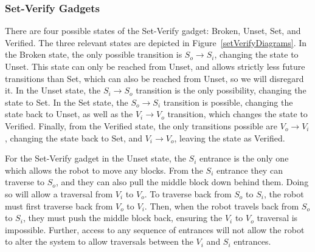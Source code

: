 %
\subsubsection{Set-Verify Gadgets}
\label{sec:SetVerifyGadgets}
There are four possible states of the Set-Verify gadget: Broken, Unset, Set, and Verified. The three relevant states are depicted in Figure~\ref{setVerifyDiagrams}. In the Broken state, the only possible transition is $S_o \rightarrow S_i$, changing the state to Unset. This state can only be reached from Unset, and allows strictly less future transitions than Set, which can also be reached from Unset, so we will disregard it. In the Unset state, the $S_i \rightarrow S_o$ transition is the only possibility, changing the state to Set. In the Set state, the $S_o \rightarrow S_i$ transition is possible, changing the state back to Unset, as well as the $V_i \rightarrow V_o$ transition, which changes the state to Verified. Finally, from the Verified state, the only transitions possible are $V_o \rightarrow V_i$, changing the state back to Set, and $V_i \rightarrow V_o$, leaving the state as Verified.

For the Set-Verify gadget in the Unset state, the $S_i$ entrance is the only one which allows the robot to move any blocks. From the $S_i$ entrance they can traverse to $S_o$, and they can also pull the middle block down behind them. Doing so will allow a traversal from $V_i$ to $V_o$. To traverse back from $S_o$ to $S_i$, the robot must first traverse back from $V_o$ to $V_i$. Then, when the robot travels back from $S_o$ to $S_i$, they must push the middle block back, ensuring the $V_i$ to $V_o$ traversal is impossible. Further, access to any sequence of entrances will not allow the robot to alter the system to allow traversals between the $V_i$ and $S_i$ entrances. 

